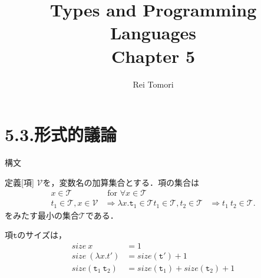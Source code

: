 \documentclass[9pt]{beamer}
\title{Types and Programming Languages\\ Chapter 5}
\author{Rei Tomori}
\begin{document}
\maketitle
\section{5.3.形式的議論}
\begin{frame}{構文}
    \begin{block}{定義[項]}
        $\mathcal{V}$を，変数名の加算集合とする．項の集合は
    \begin{align*}
    x\in\mathcal{T} &\text{\ for\ }\forall x \in\mathcal{T}\\
    t_{1}\in \mathcal{T}, x\in\mathcal{V}&\Rightarrow \lambda x.\mathtt{t}_{1}\in\mathcal{T}
    t_{1}\in\mathcal{T}, t_{2}\in\mathcal{T}&\Rightarrow t_{1}\ t_{2}\in\mathcal{T}.
    \end{align*}
    をみたす最小の集合$\mathcal{T}$である．
\end{block}
項$\mathtt{t}$のサイズは，
\begin{align*}
    size\ x &= 1\\
    size\ (\lambda x. t') &= size(\mathtt{t'}) + 1\\
    size (\mathtt{t}_{1}\ \mathtt{t}_{2}) &= size(\mathtt{t}_{1}) + size(\mathtt{t}_{2}) + 1
\end{align*}
\end{frame}
\end{document}
